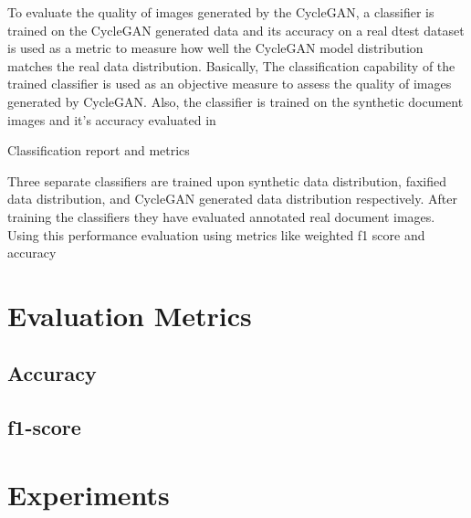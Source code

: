 \justifying
\setlength{\parskip}{1em}

To evaluate the quality of images generated by the \ac{CycleGAN}, a classifier is trained on the \ac{CycleGAN} generated data and its accuracy on a real dtest dataset is used as a metric to measure how well the \ac{CycleGAN} model distribution matches the real data distribution. Basically, The classification capability of the trained classifier is used as an objective measure to assess the quality of images generated by \ac{CycleGAN}.
Also, the classifier is trained on the synthetic document images and it's accuracy evaluated in 



Classification report and metrics



Three separate classifiers are trained upon synthetic data distribution, faxified data distribution, and \ac{CycleGAN} generated data distribution respectively. After training the classifiers they have evaluated annotated real document images. Using this performance evaluation using metrics like weighted f1 score and accuracy 	


\section{Evaluation Metrics}



\subsection{Accuracy}


\subsection{f1-score}


\section{Experiments}\label{experiments}


